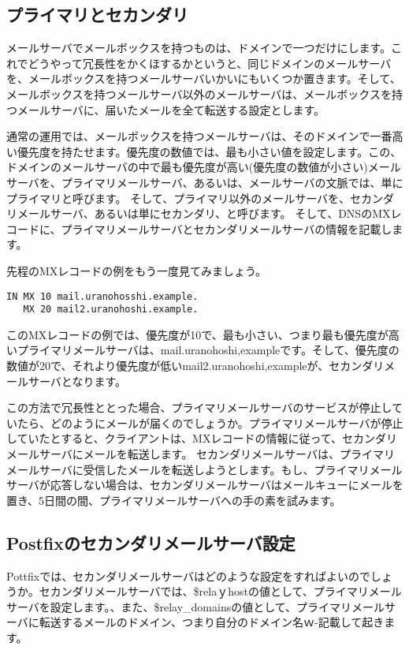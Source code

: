 \subsection{プライマリとセカンダリ}

メールサーバでメールボックスを持つものは、ドメインで一つだけにします。これでどうやって冗長性をかくほするかというと、同じドメインのメールサーバを、メールボックスを持つメールサーバいかいにもいくつか置きます。そして、メールボックスを持つメールサーバ以外のメールサーバは、メールボックスを持つメールサーバに、届いたメールを全て転送する設定とします。

通常の運用では、メールボックスを持つメールサーバは、そのドメインで一番高い優先度を持たせます。優先度の数値では、最も小さい値を設定します。この、ドメインのメールサーバの中で最も優先度が高い(優先度の数値が小さい)メールサーバを、プライマリメールサーバ、あるいは、メールサーバの文脈では、単にプライマリと呼びます。
そして、プライマリ以外のメールサーバを、セカンダリメールサーバ、あるいは単にセカンダリ、と呼びます。
そして、DNSのMXレコードに、プライマリメールサーバとセカンダリメールサーバの情報を記載します。

先程のMXレコードの例をもう一度見てみましょう。

\begin{verbatim}
IN MX 10 mail.uranohosshi.example.
   MX 20 mail2.uranohoshi.example.
\end{verbatim}

このMXレコードの例では、優先度が10で、最も小さい、つまり最も優先度が高いプライマリメールサーバは、mail.uranohoshi,exampleです。そして、優先度の数値が20で、それより優先度が低いmail2.uranohoshi,exampleが、セカンダリメールサーバとなります。

この方法で冗長性ととった場合、プライマリメールサーバのサービスが停止していたら、どのようにメールが届くのでしょうか。プライマリメールサーバが停止していたとすると、クライアントは、MXレコードの情報に従って、セカンダリメールサーバにメールを転送します。
セカンダリメールサーバは、プライマリメールサーバに受信したメールを転送しようとします。もし、プライマリメールサーバが応答しない場合は、セカンダリメールサーバはメールキューにメールを置き、5日間の間、プライマリメールサーバへの手の素を試みます。

\subsection{Postfixのセカンダリメールサーバ設定}
Pottfixでは、セカンダリメールサーバはどのような設定をすればよいのでしょうか。セカンダリメールサーバでは、\$relaｙhostの値として、プライマリメールサーバを設定します。、また、\$relay\_domainsの値として、プライマリメールサーバに転送するメールのドメイン、つまり自分のドメイン名ｗ-記載して起きます。

